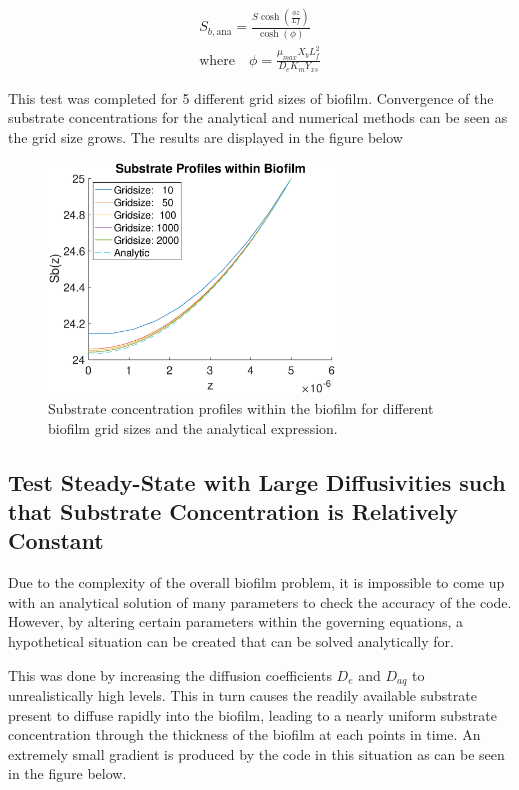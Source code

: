 \documentclass[letterpaper, twoside]{article}
\numberwithin{equation}{section}
\begin{document}
\begin{align}
{S_{b,\mathrm{ana}}}=\frac{S{\cosh(\frac{{\phi}{z}}{Lf})}}{\cosh(\phi)}\\
\text{where}{\quad} {\phi}=\frac{\mu_{max}{X_b}{L_f^{2}}}{{D_e}{K_m}{Y_{xs}}}
\end{align}

This test was completed for 5 different grid sizes of biofilm. Convergence of the substrate concentrations for the analytical and numerical methods can be seen as the grid size grows. The results are displayed in the figure below

\begin{figure}[H]
  \centering
  \includegraphics[read=eps, width=3in]{BiofilmDiffusion_Figure1.eps}
  \caption{Substrate concentration profiles within the biofilm for different biofilm grid sizes and the analytical expression.}
\end{figure}

\subsection{Test Steady-State with Large Diffusivities such that Substrate Concentration is Relatively Constant}

Due to the complexity of the overall biofilm problem, it is impossible to come up with an analytical solution of many parameters to check the accuracy of the code. However, by altering certain parameters within the governing equations, a hypothetical situation can be created that can be solved analytically for.

This was done by increasing the diffusion coefficients $D_e$ and $D_{aq}$ to unrealistically high levels. This in turn causes the readily available substrate present to diffuse rapidly into the biofilm, leading to a nearly uniform substrate concentration through the thickness of the biofilm at each points in time. An extremely small gradient is produced by the code in this situation as can be seen in the figure below.
\end{document}
